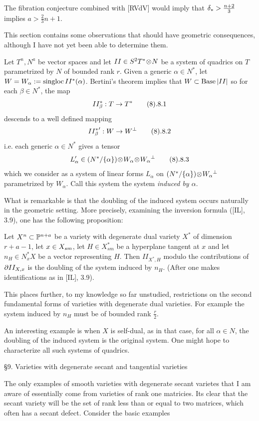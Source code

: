The fibration conjecture combined
with  [RVdV] would imply that $\delta_{*} >
\frac{n+2}3$ implies $a>\frac 23 n+1$. 
 

This section contains some observations that   should
have geometric consequences, although I have not yet been able
to determine them.

Let $T^n,N^a$ be vector spaces and let $II\in S^2T^*\!\otimes\! N$ be
a system of quadrics on $T$ parametrized by $N$ of bounded rank $r$.
Given a generic $\alpha\in N^*$, let $W=W_{\alpha}:=\text{singloc}\,
II^*(\alpha)$.
Bertini's theorem implies that $W\subset\text{Base}\, | II |$ so
for each $\beta\in N^*$, the map
$$
II^*_{\beta}: T\ra T^* \tag 8.8.1
$$
descends to a well defined mapping
$$
{II^*_{\beta}}': W\ra W\upperp \tag 8.8.2
$$
i.e. each generic $\alpha\in N^*$ gives a tensor
$$
L_{\alpha}'\in (N^*/\{\alpha\})\ot W_{\alpha}\ot W_{\alpha}\upperp\tag
8.8.3
$$
which we consider as a system of linear forms  $L_{\alpha}$ on
$(N^*/\{\alpha\}) \!\otimes\! W_{\alpha}{}^{\perp}$ parametrized
by $W_{\alpha}$.
  Call this system
the system {\it induced by $\alpha$}.

What is remarkable is that the doubling of the
induced  system occurs
naturally in the geometric setting. More precisely,
examining the inversion formula ([IL], 3.9), one has the following
proposition:

 Let $X^n\subset\Bbb P^{n+a}$ be a variety
with degenerate dual variety $X^*$ of dimension $r+a-1$,
let $x\in X_{sm}$, let $H\in X^*_{sm}$ be a hyperplane tangent
at $x$ and let $n_H\in N^*_xX$ be a vector representing $H$.
Then  $II_{X^*,H}$ modulo the contributions
of $\partial II_{X,x}$ is the doubling of the   system induced
by $n_H$. (After one makes identifications as in [IL], 3.9).
\endproclaim

This places further, to my knowledge so far unstudied, restrictions
on the second fundamental forms of varieties with degenerate dual
varieties. For example the system induced by $n_H$
must be of bounded rank $\frac r2$.

 
 An interesting example is when $X$ is self-dual, as in that case,
for all $\alpha\in N$, the doubling of the induced system is the
original system. One might hope to characterize all such systems
of quadrics.
 
\heading \S 9. Varieties with degenerate 
secant and tangential varieties\endheading

 The only examples of smooth varieties with
degenerate
secant varietes that I am aware of essentially come from 
varieties of  rank one
matricies. Its clear that the secant variety will be the set of rank
less than or equal to two matrices, which often  has
a secant defect. 
Consider the basic examples

